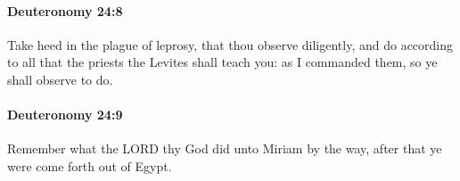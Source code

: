 		\paragraph{Deuteronomy 24:8} %
			\label{DEUTERONOMY-24-8}

			Take heed in the plague of leprosy, that thou observe diligently, and do according to all that the priests the Levites shall teach you: as I commanded them, so ye shall observe to do.


		\paragraph{Deuteronomy 24:9} %
			\label{DEUTERONOMY-24-9}

			Remember what the LORD thy God did unto Miriam by the way, after that ye were come forth out of Egypt.


